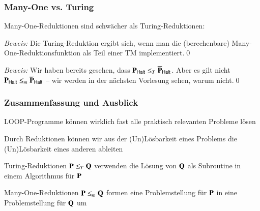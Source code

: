 \documentclass[aspectratio=1610,onlymath]{beamer}
\begin{document}
\begin{frame}\frametitle{Many-One vs. Turing}
\pause

Many-One-Reduktionen sind schwächer als Turing-Reduktionen:\bigskip


\emph{Beweis:} Die Turing-Reduktion ergibt sich, wenn man die (berechenbare) Many-One-Reduktionsfunktion als Teil einer TM implementiert.\qed
\bigskip\pause


\emph{Beweis:} Wir haben bereits gesehen, dass $\textbf{\textcolor{black}{P}}_{\textsf{Halt}}\leq_T\overline{\textbf{\textcolor{black}{P}}}_{\textsf{Halt}}$. Aber es gilt nicht $\textbf{\textcolor{black}{P}}_{\textsf{Halt}}\leq_m\overline{\textbf{\textcolor{black}{P}}}_{\textsf{Halt}}$ -- wir werden in der nächsten Vorlesung sehen, warum nicht.\qed

\end{frame}

% 
% 
% 
% 
% 



\begin{frame}\frametitle{Zusammenfassung und Ausblick}

LOOP-Programme können wirklich fast alle praktisch relevanten Probleme lösen
\bigskip

Durch Reduktionen können wir aus der (Un)Lösbarkeit eines Problems die (Un)Lösbarkeit eines anderen ableiten\bigskip

Turing-Reduktionen $\textbf{\textcolor{black}{P}}\leq_T\textbf{\textcolor{black}{Q}}$ verwenden die Lösung von $\textbf{\textcolor{black}{Q}}$ als Subroutine in einem Algorithmus für $\textbf{\textcolor{black}{P}}$
\bigskip

Many-One-Reduktionen $\textbf{\textcolor{black}{P}}\leq_m\textbf{\textcolor{black}{Q}}$ formen eine Problemstellung für $\textbf{\textcolor{black}{P}}$ in eine Problemstellung für $\textbf{\textcolor{black}{Q}}$ um
\bigskip


\end{frame}
\end{document}
